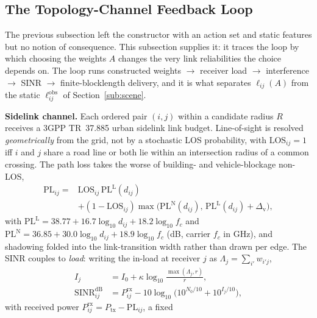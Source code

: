 \documentclass[journal]{IEEEtran}
\begin{document}
\subsection{The Topology-Channel Feedback Loop}\label{sub:rel}

The previous subsection left the constructor with an action set and static
features but no notion of consequence. This subsection supplies it: it traces the
loop by which choosing the weights $A$ changes the very link reliabilities the
choice depends on. The loop runs constructed weights $\to$ receiver load $\to$
interference $\to$ SINR $\to$ finite-blocklength delivery, and it is what
separates $\ell_{ij}(A)$ from the static $\ell_{ij}^{\mathrm{obs}}$ of
Section~\ref{sub:scene}.

\textbf{Sidelink channel.} Each ordered pair $(i,j)$ within a candidate radius
$R$ receives a 3GPP TR~37.885
\cite{PLACEHOLDER_3gpp_37885,PLACEHOLDER_nr_v2x_sidelink} urban sidelink link
budget. Line-of-sight is resolved \emph{geometrically} from the grid, not by a
stochastic LOS probability, with $\mathrm{LOS}_{ij}{=}1$ iff $i$ and $j$ share a
road line or both lie within an intersection radius of a common crossing. The path
loss takes the worse of building- and vehicle-blockage non-LOS,
\begin{equation}
  \begin{aligned}
  \mathrm{PL}_{ij}={}&\mathrm{LOS}_{ij}\,\mathrm{PL}^{\mathrm L}(d_{ij})\\
  &+(1-\mathrm{LOS}_{ij})\max\!\big(\mathrm{PL}^{\mathrm N}(d_{ij}),\,
  \mathrm{PL}^{\mathrm L}(d_{ij})+\Delta_{\mathrm v}\big),
  \end{aligned}
  \label{eq:pathloss}
\end{equation}
with $\mathrm{PL}^{\mathrm L}{=}38.77{+}16.7\log_{10}d_{ij}{+}18.2\log_{10}f_c$ and
$\mathrm{PL}^{\mathrm N}{=}36.85{+}30.0\log_{10}d_{ij}{+}18.9\log_{10}f_c$ (dB,
carrier $f_c$ in GHz), and shadowing folded into the link-transition width rather
than drawn per edge. The SINR couples to \emph{load}: writing the
in-load at receiver $j$ as $\Lambda_j=\sum_{i'}w_{i'j}$,
\begin{equation}
  \begin{aligned}
  I_j&=I_0+\kappa\log_{10}\!\frac{\max(\Lambda_j,r)}{r},\\
  \mathrm{SINR}^{\mathrm{dB}}_{ij}&=P^{\mathrm{rx}}_{ij}-10\log_{10}\!\big(10^{N_0/10}+10^{I_j/10}\big),
  \end{aligned}
  \label{eq:sinr}
\end{equation}
with received power $P^{\mathrm{rx}}_{ij}=P_{\mathrm{tx}}-\mathrm{PL}_{ij}$, a fixed
\end{document}
